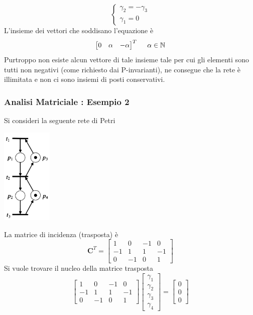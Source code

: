 \documentclass[10pt, letterpaper]{report}
\begin{document}
$$ 
\begin{cases}
    \gamma_2=-\gamma_3\\ 
    \gamma_1=0
\end{cases}
$$
L'insieme dei vettori che soddisano l'equazione è 
$$ \begin{bmatrix}
    0 & \alpha & -\alpha
\end{bmatrix}^T \ \ \ \ \alpha\in {\mathbb N}$$
Purtroppo non esiste alcun vettore di tale insieme tale per cui gli elementi sono tutti non negativi (come richiesto dai P-invarianti), ne consegue che la rete è illimitata e non ci sono insiemi di posti conservativi. 
\subsubsection{Analisi Matriciale : Esempio 2} 
Si consideri la seguente rete di Petri
\begin{center}
    \includegraphics[width=0.18\textwidth]{images/petriMatrix2.pdf}
\end{center}
La matrice di incidenza (trasposta) è 
$$ \mathbf C^T = 
\begin{bmatrix}
    1 & 0& -1 & 0 \\ 
    -1 & 1 & 1 &-1\\ 
    0 & -1 & 0 & 1
\end{bmatrix}
$$
Si vuole trovare il nucleo della matrice trasposta$$
\begin{bmatrix}
    1 & 0& -1 & 0 \\ 
    -1 & 1 & 1 &-1\\ 
    0 & -1 & 0 & 1
\end{bmatrix}\begin{bmatrix}
    \gamma_1\\\gamma_2\\ \gamma_3\\ \gamma_4
\end{bmatrix}=\begin{bmatrix}
    0 \\ 0 \\ 0 
\end{bmatrix}$$
\end{document}
